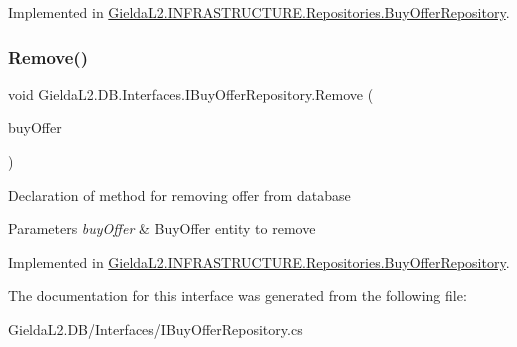 Implemented in \mbox{\hyperlink{class_gielda_l2_1_1_i_n_f_r_a_s_t_r_u_c_t_u_r_e_1_1_repositories_1_1_buy_offer_repository_adf2f5395c33786befc29d371aecee31d}{Gielda\+L2.\+I\+N\+F\+R\+A\+S\+T\+R\+U\+C\+T\+U\+R\+E.\+Repositories.\+Buy\+Offer\+Repository}}.

\mbox{\label{interface_gielda_l2_1_1_d_b_1_1_interfaces_1_1_i_buy_offer_repository_af9d25dfd52c71cc21dd7a89bf54f2ee4}} 
\subsubsection{\texorpdfstring{Remove()}{Remove()}}
{\footnotesize\ttfamily void Gielda\+L2.\+D\+B.\+Interfaces.\+I\+Buy\+Offer\+Repository.\+Remove (\begin{DoxyParamCaption}\item[{\mbox{\hyperlink{class_gielda_l2_1_1_d_b_1_1_entities_1_1_buy_offer}{Buy\+Offer}}}]{buy\+Offer }\end{DoxyParamCaption})}



Declaration of method for removing offer from database 


\begin{DoxyParams}{Parameters}
{\em buy\+Offer} & Buy\+Offer entity to remove\\
\hline
\end{DoxyParams}


Implemented in \mbox{\hyperlink{class_gielda_l2_1_1_i_n_f_r_a_s_t_r_u_c_t_u_r_e_1_1_repositories_1_1_buy_offer_repository_a14dec5a8063f5d8b6a106f65fc6ec293}{Gielda\+L2.\+I\+N\+F\+R\+A\+S\+T\+R\+U\+C\+T\+U\+R\+E.\+Repositories.\+Buy\+Offer\+Repository}}.



The documentation for this interface was generated from the following file\+:\begin{DoxyCompactItemize}
\item 
Gielda\+L2.\+D\+B/\+Interfaces/I\+Buy\+Offer\+Repository.\+cs\end{DoxyCompactItemize}
